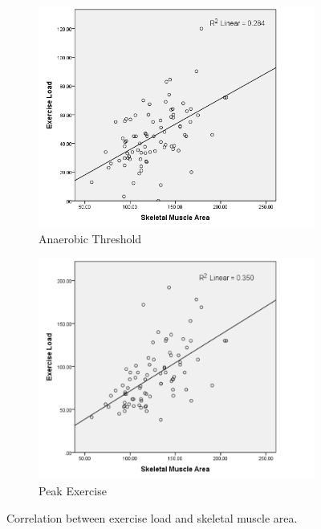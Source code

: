 \begin{figure}[htb]
	\centering
	\begin{subfigure}[b]{0.45\textwidth}
		\centering
		\includegraphics[width=\textwidth]{Figures/bc_scatter_atLoad_skeletal}
		\caption{Anaerobic Threshold}
		\label{fig:bc_at_load_vs_sm}
	\end{subfigure}
	\hfill
	\begin{subfigure}[b]{0.45\textwidth}
		\centering
		\includegraphics[width=\textwidth]{Figures/bc_scatter_pkLoad_skeletal}
		\caption{Peak Exercise}
		\label{fig:bc_pk_load_vs_sm}
	\end{subfigure}
	\caption{Correlation between exercise load and skeletal muscle area.}	
	\label{fig:bc_load_vs_sm}
	
\end{figure}

